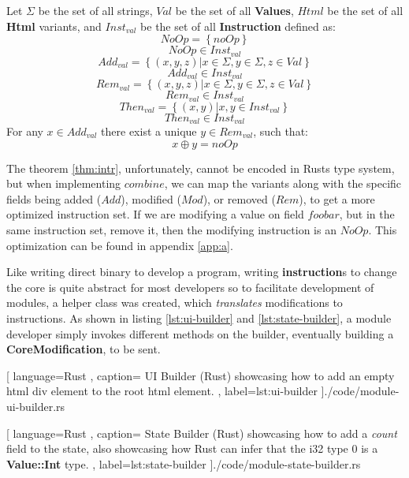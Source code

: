 \begin{theorem} \label{thm:intr}
  Let $\Sigma$ be the set of all strings, $Val$ be the set of all
  \textbf{Values}, $Html$ be the set of all \textbf{Html} variants, and
  $Inst_{val}$ be the set of all \textbf{Instruction} defined as:
  $$
    NoOp = \left \{ noOp \right \}
  $$
  $$
    NoOp \in Inst_{val}
  $$
  $$
    Add_{val} = \left \{ (x, y, z) \vert x \in \Sigma, y \in \Sigma, z \in Val \right \}
  $$
  $$
    Add_{val} \in Inst_{val}
  $$
  $$
    Rem_{val} = \left \{ (x, y, z) \vert x \in \Sigma, y \in \Sigma, z \in Val \right \}
  $$
  $$
    Rem_{val} \in Inst_{val}
  $$
  $$
    Then_{val} = \left \{ (x, y) \vert x, y \in Inst_{val} \right \}
  $$
  $$
    Then_{val} \in Inst_{val}
  $$
  For any $x \in Add_{val}$ there exist a unique $y \in Rem_{val}$, such that:
  $$
    x \oplus y = noOp
  $$
\end{theorem}

The theorem \ref{thm:intr}, unfortunately, cannot be encoded in Rusts type
system, but when implementing $combine$, we can map the variants along with the
specific fields being added ($Add$), modified ($Mod$), or removed ($Rem$), to get
a more optimized instruction set. If we are modifying a value on field $foobar$,
but in the same instruction set, remove it, then the modifying instruction is an
$NoOp$. This optimization can be found in appendix \ref{app:a}.

Like writing direct binary to develop a program, writing \textbf{instruction}s to
change the core is quite abstract for most developers so to facilitate development
of modules, a helper class was created, which \textit{translates} modifications
to instructions. As shown in listing \ref{lst:ui-builder} and
\ref{lst:state-builder}, a module developer simply invokes different methods on
the builder, eventually building a \textbf{CoreModification}, to be sent.

\begin{center}
  
   [ language=Rust
   , caption={
     UI Builder (Rust) showcasing how to add an empty \gls{html} div element to
     the root \gls{html} element.
   }
   , label=lst:ui-builder
   ]{./code/module-ui-builder.rs}
\end{center}

\begin{center}
  
   [ language=Rust
   , caption={
     State Builder (Rust) showcasing how to add a \textit{count} field to the
     state, also showcasing how Rust can infer that the i32 type $0$ is
     a \textbf{Value::Int} type.
   }
   , label=lst:state-builder
   ]{./code/module-state-builder.rs}
\end{center}

